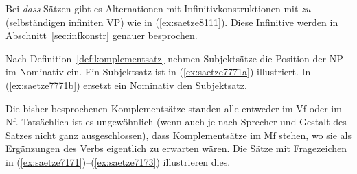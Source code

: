 Bei \textit{dass}-Sätzen gibt es Alternationen mit Infinitivkonstruktionen mit \textit{zu} (selbständigen infiniten VP) wie in (\ref{ex:saetze8111}).
Diese Infinitive werden in Abschnitt~\ref{sec:infkonstr} genauer besprochen.

\begin{exe}
  \ex\label{ex:saetze8111}
  \begin{xlist}
  \end{xlist}
\end{exe}

Nach Definition~\ref{def:komplementsatz} nehmen Subjektsätze die Position der NP im Nominativ ein.
Ein Subjektsatz ist in (\ref{ex:saetze7771a}) illustriert.
In (\ref{ex:saetze7771b}) ersetzt ein Nominativ den Subjektsatz.

\begin{exe}
  \ex\label{ex:saetze7771} 
  \begin{xlist}
  \end{xlist}
\end{exe}

Die bisher besprochenen Komplementsätze standen alle entweder im Vf oder im Nf.
Tatsächlich ist es ungewöhnlich (wenn auch je nach Sprecher und Gestalt des Satzes nicht ganz ausgeschlossen), dass Komplementsätze im Mf stehen, wo sie als Ergänzungen des Verbs eigentlich zu erwarten wären.
Die Sätze mit Fragezeichen in (\ref{ex:saetze7171})--(\ref{ex:saetze7173}) illustrieren dies.

\begin{exe}
  \ex\label{ex:saetze7171}
  \begin{xlist}
  \end{xlist}
  \ex\label{ex:saetze7172}
  \begin{xlist}
  \end{xlist}
  \ex\label{ex:saetze7173}
  \begin{xlist}
  \end{xlist}
\end{exe}

